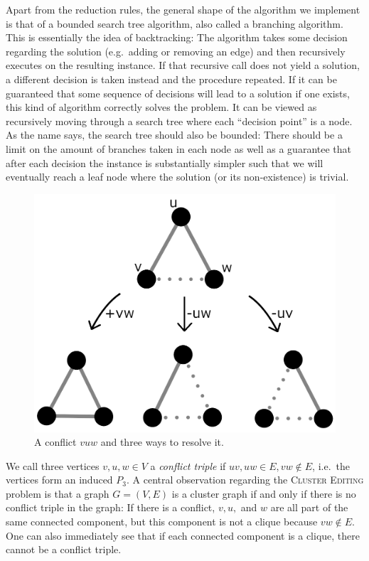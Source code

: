 \documentclass[12pt,oneside,english,parskip=full,headings=small]{scrbook}
\theoremstyle{definition}
\begin{document}
Apart from the reduction rules, the general shape of the algorithm we implement is that of a bounded
search tree algorithm, also called a branching algorithm. This is essentially the idea of
backtracking: The algorithm takes some decision regarding the solution (e.g.\ adding or removing an
edge) and then recursively executes on the resulting instance. If that recursive call does not yield
a solution, a different decision is taken instead and the procedure repeated. If it can be
guaranteed that some sequence of decisions will lead to a solution if one exists, this kind of
algorithm correctly solves the problem. It can be viewed as recursively moving through a search tree
where each ``decision point'' is a node. As the name says, the search tree should also be bounded:
There should be a limit on the amount of branches taken in each node as well as a guarantee that
after each decision the instance is substantially simpler such that we will eventually reach a leaf
node where the solution (or its non-existence) is trivial.

\begin{figure}[h]
	\centering
	\includegraphics[scale=0.5]{conflicts}
	\caption{A conflict $v u w$ and three ways to resolve it.}
	\label{fig:conflicts}
\end{figure}

We call three vertices $v, u, w \in V$ a \emph{conflict triple} if $uv, uw \in E, vw \notin E$,
i.e.\ the vertices form an induced $P_3$. A central observation regarding the \textsc{Cluster
Editing} problem is that a graph $G = (V, E)$ is a cluster graph if and only if there is no
conflict triple in the graph: If there is a conflict, $v, u,$ and $w$ are all part of the same
connected component, but this component is not a clique because $vw \notin E$. One can also
immediately see that if each connected component is a clique, there cannot be a conflict triple.
\end{document}
